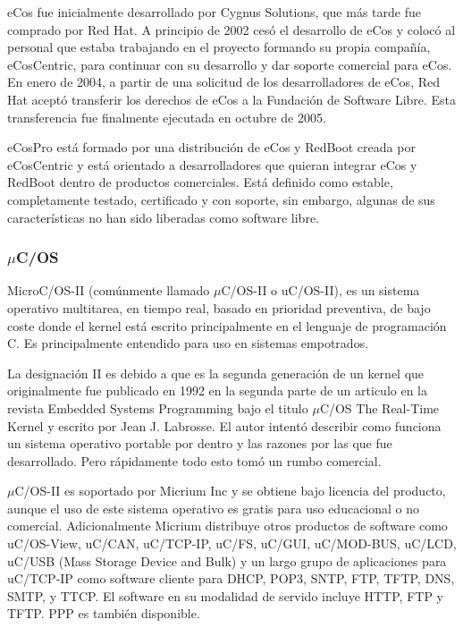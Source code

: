 eCos fue inicialmente desarrollado por Cygnus Solutions, que más tarde fue comprado por Red Hat. A principio de 2002 cesó el desarrollo de eCos y colocó al personal que estaba trabajando en el proyecto formando su propia compañía, eCosCentric, para continuar con su desarrollo y dar soporte comercial para eCos. En enero de 2004, a partir de una solicitud de los desarrolladores de eCos, Red Hat aceptó transferir los derechos de eCos a la Fundación de Software Libre. Esta transferencia fue finalmente ejecutada en octubre de 2005.



eCosPro está formado por una distribución de eCos y RedBoot creada por eCosCentric y está orientado a desarrolladores que quieran integrar eCos y RedBoot dentro de productos comerciales. Está definido como estable, completamente testado, certificado y con soporte, sin embargo, algunas de sus características no han sido liberadas como software libre.



\subsubsection{\(\mu\)C/OS}
MicroC/OS-II (comúnmente llamado \(\mu\)C/OS-II o uC/OS-II), es un sistema operativo multitarea, en tiempo real, basado en prioridad preventiva, de bajo coste donde el kernel está escrito principalmente en el lenguaje de programación C. Es principalmente entendido para uso en sistemas empotrados.



La designación II es debido a que es la segunda generación de un kernel que originalmente fue publicado en 1992 en la segunda parte de un articulo en la revista Embedded Systems Programming bajo el titulo \(\mu\)C/OS The Real-Time Kernel y escrito por Jean J. Labrosse. El autor intentó describir como funciona un sistema operativo portable por dentro y las razones por las que fue desarrollado. Pero rápidamente todo esto tomó un rumbo comercial.



\(\mu\)C/OS-II es soportado por Micrium Inc y se obtiene bajo licencia del producto, aunque el uso de este sistema operativo es gratis para uso educacional o no comercial. Adicionalmente Micrium distribuye otros productos de software como uC/OS-View, uC/CAN, uC/TCP-IP, uC/FS, uC/GUI, uC/MOD-BUS, uC/LCD, uC/USB (Mass Storage Device and Bulk) y un largo grupo de aplicaciones para uC/TCP-IP como software cliente para DHCP, POP3, SNTP, FTP, TFTP, DNS, SMTP, y TTCP. El software en su modalidad de servido incluye HTTP, FTP y TFTP. PPP es también disponible.




